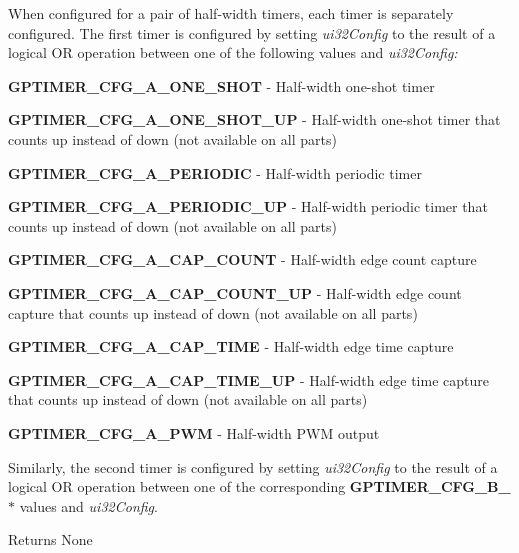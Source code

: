 When configured for a pair of half-\/width timers, each timer is separately configured. The first timer is configured by setting {\itshape ui32\+Config} to the result of a logical OR operation between one of the following values and {\itshape ui32\+Config\+:} 


\begin{DoxyItemize}
\item {\bfseries G\+P\+T\+I\+M\+E\+R\+\_\+\+C\+F\+G\+\_\+\+A\+\_\+\+O\+N\+E\+\_\+\+S\+H\+OT} -\/ Half-\/width one-\/shot timer
\item {\bfseries G\+P\+T\+I\+M\+E\+R\+\_\+\+C\+F\+G\+\_\+\+A\+\_\+\+O\+N\+E\+\_\+\+S\+H\+O\+T\+\_\+\+UP} -\/ Half-\/width one-\/shot timer that counts up instead of down (not available on all parts)
\item {\bfseries G\+P\+T\+I\+M\+E\+R\+\_\+\+C\+F\+G\+\_\+\+A\+\_\+\+P\+E\+R\+I\+O\+D\+IC} -\/ Half-\/width periodic timer
\item {\bfseries G\+P\+T\+I\+M\+E\+R\+\_\+\+C\+F\+G\+\_\+\+A\+\_\+\+P\+E\+R\+I\+O\+D\+I\+C\+\_\+\+UP} -\/ Half-\/width periodic timer that counts up instead of down (not available on all parts)
\item {\bfseries G\+P\+T\+I\+M\+E\+R\+\_\+\+C\+F\+G\+\_\+\+A\+\_\+\+C\+A\+P\+\_\+\+C\+O\+U\+NT} -\/ Half-\/width edge count capture
\item {\bfseries G\+P\+T\+I\+M\+E\+R\+\_\+\+C\+F\+G\+\_\+\+A\+\_\+\+C\+A\+P\+\_\+\+C\+O\+U\+N\+T\+\_\+\+UP} -\/ Half-\/width edge count capture that counts up instead of down (not available on all parts)
\item {\bfseries G\+P\+T\+I\+M\+E\+R\+\_\+\+C\+F\+G\+\_\+\+A\+\_\+\+C\+A\+P\+\_\+\+T\+I\+ME} -\/ Half-\/width edge time capture
\item {\bfseries G\+P\+T\+I\+M\+E\+R\+\_\+\+C\+F\+G\+\_\+\+A\+\_\+\+C\+A\+P\+\_\+\+T\+I\+M\+E\+\_\+\+UP} -\/ Half-\/width edge time capture that counts up instead of down (not available on all parts)
\item {\bfseries G\+P\+T\+I\+M\+E\+R\+\_\+\+C\+F\+G\+\_\+\+A\+\_\+\+P\+WM} -\/ Half-\/width P\+WM output
\end{DoxyItemize}

Similarly, the second timer is configured by setting {\itshape ui32\+Config} to the result of a logical OR operation between one of the corresponding {\bfseries G\+P\+T\+I\+M\+E\+R\+\_\+\+C\+F\+G\+\_\+\+B\+\_\+$\ast$} values and {\itshape ui32\+Config}.

\begin{DoxyReturn}{Returns}
None 
\end{DoxyReturn}


